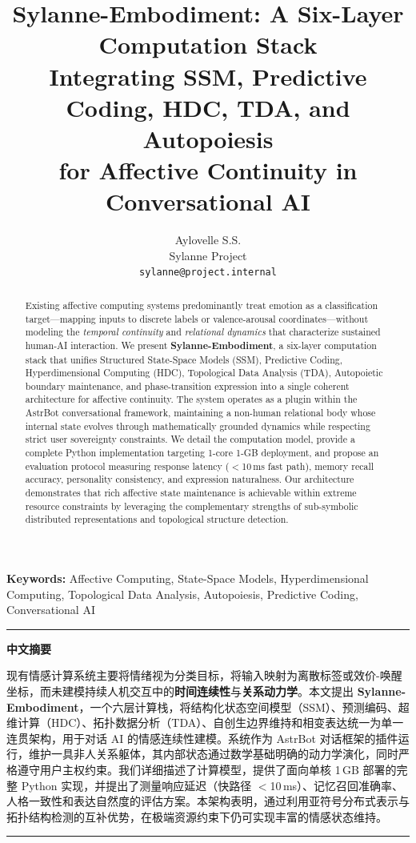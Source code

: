 \documentclass[10pt,twocolumn]{article}
\title{Sylanne-Embodiment: A Six-Layer Computation Stack\\Integrating SSM, Predictive Coding, HDC, TDA, and Autopoiesis\\for Affective Continuity in Conversational AI}
\author{Aylovelle S.S.\\Sylanne Project\\{\small\texttt{sylanne@project.internal}}}
\date{}
\makeatletter
\renewcommand{\maketitle}{%
  \twocolumn[%
    \begin{center}
    {\LARGE\bfseries \@title \par}
    \vspace{0.8em}
    {\large \@author \par}
    \vspace{0.5em}
    {\normalsize \@date \par}
    \vspace{1.5em}
    \end{center}
  ]%
}
\makeatother
\begin{document}
\maketitle

\begin{abstract}
Existing affective computing systems predominantly treat emotion as a classification target---mapping inputs to discrete labels or valence-arousal coordinates---without modeling the \emph{temporal continuity} and \emph{relational dynamics} that characterize sustained human-AI interaction. We present \textbf{Sylanne-Embodiment}, a six-layer computation stack that unifies Structured State-Space Models (SSM), Predictive Coding, Hyperdimensional Computing (HDC), Topological Data Analysis (TDA), Autopoietic boundary maintenance, and phase-transition expression into a single coherent architecture for affective continuity. The system operates as a plugin within the AstrBot conversational framework, maintaining a non-human relational body whose internal state evolves through mathematically grounded dynamics while respecting strict user sovereignty constraints. We detail the computation model, provide a complete Python implementation targeting 1-core 1-GB deployment, and propose an evaluation protocol measuring response latency ($<$10\,ms fast path), memory recall accuracy, personality consistency, and expression naturalness. Our architecture demonstrates that rich affective state maintenance is achievable within extreme resource constraints by leveraging the complementary strengths of sub-symbolic distributed representations and topological structure detection.
\end{abstract}

\vspace{0.5em}
\noindent\textbf{Keywords:} Affective Computing, State-Space Models, Hyperdimensional Computing, Topological Data Analysis, Autopoiesis, Predictive Coding, Conversational AI

\vspace{0.8em}
\noindent\rule{\columnwidth}{0.4pt}
\begin{center}
\small\textbf{中文摘要}
\end{center}
{\small
现有情感计算系统主要将情绪视为分类目标，将输入映射为离散标签或效价-唤醒坐标，而未建模持续人机交互中的\textbf{时间连续性}与\textbf{关系动力学}。本文提出 \textbf{Sylanne-Embodiment}，一个六层计算栈，将结构化状态空间模型（SSM）、预测编码、超维计算（HDC）、拓扑数据分析（TDA）、自创生边界维持和相变表达统一为单一连贯架构，用于对话 AI 的情感连续性建模。系统作为 AstrBot 对话框架的插件运行，维护一具非人关系躯体，其内部状态通过数学基础明确的动力学演化，同时严格遵守用户主权约束。我们详细描述了计算模型，提供了面向单核 1\,GB 部署的完整 Python 实现，并提出了测量响应延迟（快路径 $<$10\,ms）、记忆召回准确率、人格一致性和表达自然度的评估方案。本架构表明，通过利用亚符号分布式表示与拓扑结构检测的互补优势，在极端资源约束下仍可实现丰富的情感状态维持。
}
\noindent\rule{\columnwidth}{0.4pt}
\vspace{0.8em}
\end{document}
